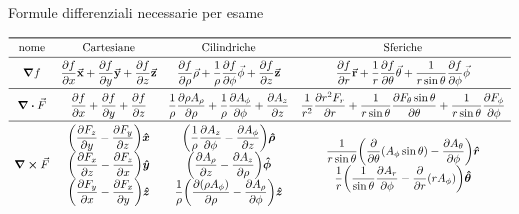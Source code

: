 \documentclass[a4paper]{article}
\begin{document}
\begin{sidewaystable}
\caption{Formule differenziali necessarie per esame}
    \[
\begin{array}{cccc}
    \toprule
    \text{nome} & \text{Cartesiane} & \text{Cilindriche} & \text{Sferiche}\\
\midrule
\displaystyle \grad{f} & 
    \displaystyle \pdv{f}{x} \va x + \pdv{f}{y} \va y + \pdv{f}{z} \va z &
    \displaystyle \pdv{f}{\rho}\va \rho + \frac{1}{\rho}\pdv{f}{\phi}\va \phi + \pdv{f}{z} \va z &
    \displaystyle \pdv{f}{r} \va r + \frac{1}{r} \pdv{f}{\theta} \va \theta + \frac{1}{r\sin{\theta}} \pdv{f}{\phi} \va \phi\\ 
\midrule
\displaystyle \div{\vec{F}} &
    \displaystyle \pdv{f}{x} + \pdv{f}{y} + \pdv{f}{z} &
    \displaystyle \frac{1}{\rho}\pdv { \rho A_\rho } { \rho}
    + \frac{1} {\rho}\pdv {A_\phi} {\phi}
    + \pdv{ A_z} {z}&
    \displaystyle \frac{1}{r^2} \pdv{r^2 F_r}{r} + \frac{1}{r \sin \theta} \pdv{F_{\theta} \sin \theta}{\theta} + {1\over r \sin \theta}\pdv{F_{\phi}}{\phi}\\ 
\midrule
\displaystyle \curl{\vec{F}} & 
\begin{matrix}
    \displaystyle \bigg(\pdv{F_z}{y} - \pdv{F_y}{z} \bigg) \boldsymbol{\hat x}\\
    \displaystyle \bigg(\pdv{F_x}{z} - \pdv{F_z}{x}\bigg) \boldsymbol{\hat y}\\
    \displaystyle \bigg(\pdv{F_y}{x} - \pdv{F_x}{y}\bigg) \boldsymbol{\hat z}
\end{matrix} & 
\begin{matrix}
    \displaystyle \bigg ({1 \over \rho}{\partial A_z \over \partial \phi}
    - {\partial A_\phi \over \partial z} \bigg ) \boldsymbol{\hat \rho}  \\
    \displaystyle \bigg ({\partial A_\rho \over \partial z} - {\partial A_z \over \partial \rho} \bigg) \boldsymbol{\hat \phi} \\
    \displaystyle{1 \over \rho}\bigg ({\partial ( \rho A_\phi ) \over \partial \rho}
    - {\partial A_\rho \over \partial \phi} \bigg ) \boldsymbol{\hat z}
\end{matrix} &
\begin{matrix}
    \displaystyle{1 \over r\sin\theta} \bigg ({\partial \over \partial \theta} ( A_\phi\sin\theta )
    - {\partial A_\theta \over \partial \phi} \bigg ) \boldsymbol{\hat r} \\
    \displaystyle{1 \over r} \bigg ({1 \over \sin\theta}{\partial A_r \over \partial \phi}
    - {\partial \over \partial r} ( r A_\phi ) \bigg ) \boldsymbol{\hat \theta}\\

\end{matrix}
\end{array}\]
\end{sidewaystable}
\end{document}
